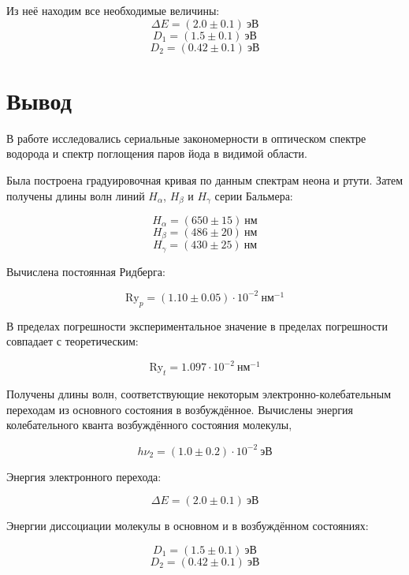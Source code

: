 		Из неё находим все необходимые величины:
		\[ \Delta E=(2.0\pm 0.1) \ \text{эВ} \] 
        \[  D_1=(1.5\pm 0.1)\  \text{эВ}  \] 
        \[ D_2=(0.42\pm 0.1) \ \text{эВ} \]

    \section{Вывод}
	В работе исследовались сериальные закономерности в оптическом спектре водорода и спектр поглощения паров йода в видимой области.
	
    Была построена градуировочная кривая по данным спектрам неона и ртути. Затем получены длины волн линий $H_{\alpha}$, $H_{\beta}$ и $H_{\gamma}$ серии Бальмера:
    
    \[	H_{\alpha} = (650\pm 15)\ \text{нм} \]
    \[  H_{\beta} = (486\pm 20)\ \text{нм} \] 
    \[  H_{\gamma} = (430\pm  25)\  \text{нм} \]
		
		
    Вычислена постоянная Ридберга:
    
    \[ \text{Ry}_p=(1.10\pm 0.05)\cdot 10^{-2} ~\text{нм}^{-1} \]

    В пределах погрешности экспериментальное значение в пределах погрешности совпадает с теоретическим:

    \[ \text{Ry}_t=1.097\cdot 10^{-2} \ \text{нм}^{-1} \]
    
	
	Получены длины волн, соответствующие некоторым электронно-колебательным переходам из основного состояния в возбуждённое. Вычислены энергия колебательного кванта возбуждённого состояния молекулы, 
    
    \[	h\nu_2=(1.0\pm 0.2)\cdot 10^{-2} \ \text{эВ} \]
    
    Энергия электронного перехода:

    \[ \Delta E=(2.0\pm 0.1) \ \text{эВ} \] 
    
    Энергии диссоциации молекулы в основном и в возбуждённом состояниях:
	
    \[  D_1=(1.5\pm 0.1)\  \text{эВ}  \] 
    \[ D_2=(0.42\pm 0.1) \ \text{эВ} \]


